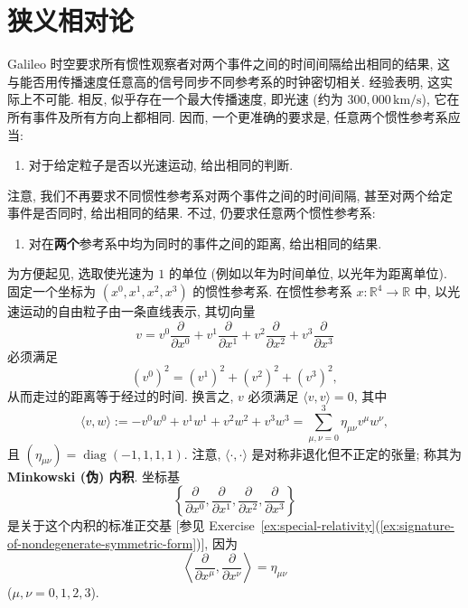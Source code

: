 \section{狭义相对论}\label{sec:special-relativity}

Galileo 时空要求所有惯性观察者对两个事件之间的时间间隔给出相同的结果, 这与能否用传播速度任意高的信号同步不同参考系的时钟密切相关. 经验表明, 这实际上不可能. 相反, 似乎存在一个最大传播速度, 即光速 (约为 $300{,}000\,\mathrm{km/s}$), 它在所有事件及所有方向上都相同. 因而, 一个更准确的要求是, 任意两个惯性参考系应当:
\begin{enumerate}[label=(\arabic*\ensuremath{'}),ref=\arabic*\ensuremath{'},leftmargin=*]
\item\label{cond:all-inertial-frames-agree-on-light-speed}
对于给定粒子是否以光速运动, 给出相同的判断.
\end{enumerate}

注意, 我们不再要求不同惯性参考系对两个事件之间的时间间隔, 甚至对两个给定事件是否同时, 给出相同的结果. 不过, 仍要求任意两个惯性参考系:
\begin{enumerate}[label=(\arabic*\ensuremath{'}),ref=\arabic*\ensuremath{'},leftmargin=*,start=2]
\item\label{cond:all-inertial-frames-agree-on-common-spatial-distance}
对在\textbf{两个}参考系中均为同时的事件之间的距离, 给出相同的结果.
\end{enumerate}

为方便起见, 选取使光速为 $1$ 的单位 (例如以年为时间单位, 以光年为距离单位). 固定一个坐标为 $(x^0,x^1,x^2,x^3)$ 的惯性参考系. 在惯性参考系 $x:\mathbb{R}^4\to\mathbb{R}$ 中, 以光速运动的自由粒子由一条直线表示, 其切向量
\[
  v=v^0\frac{\partial}{\partial x^0}
    +v^1\frac{\partial}{\partial x^1}
    +v^2\frac{\partial}{\partial x^2}
    +v^3\frac{\partial}{\partial x^3}
\]
必须满足
\begin{equation}\label{eq:minkowski-light-speed-condition}
  (v^0)^2=(v^1)^2+(v^2)^2+(v^3)^2,
\end{equation}
从而走过的距离等于经过的时间. 换言之, $v$ 必须满足 $\langle v,v\rangle=0$, 其中
\[
  \langle v,w\rangle:=-v^0w^0+v^1w^1+v^2w^2+v^3w^3
    =\sum_{\mu,\nu=0}^3\eta_{\mu\nu}v^\mu w^\nu,
\]
且 $(\eta_{\mu\nu})=\operatorname{diag}(-1,1,1,1)$. 注意, $\langle\cdot,\cdot\rangle$ 是对称非退化但不正定的张量; 称其为 \textbf{Minkowski (伪) 内积}. 坐标基
\[
  \left\{\frac{\partial}{\partial x^0},\frac{\partial}{\partial x^1},
         \frac{\partial}{\partial x^2},\frac{\partial}{\partial x^3}\right\}
\]
是关于这个内积的标准正交基 [参见 Exercise~\ref{ex:special-relativity}(\ref{ex:signature-of-nondegenerate-symmetric-form})], 因为
\[
  \left\langle\frac{\partial}{\partial x^\mu},
              \frac{\partial}{\partial x^\nu}\right\rangle=\eta_{\mu\nu}
\]
($\mu,\nu=0,1,2,3$).

